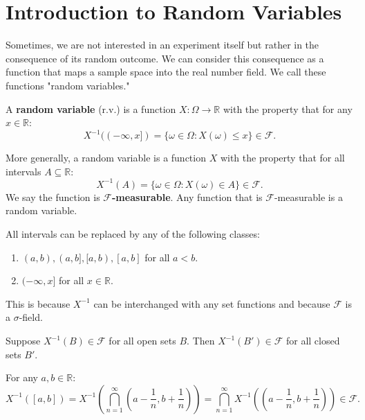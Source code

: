 \documentclass{huhtakm-template-book-v2}
\begin{document}
\section{Introduction to Random Variables}
    Sometimes, we are not interested in an experiment itself but rather in the consequence of its random outcome. We can consider this consequence as a function that maps a sample space into the real number field. We call these functions "random variables."
    \begin{defn}
        A \textbf{random variable} (r.v.) is a function $X:\Omega \to \mathbb{R}$ with the property that for any $x \in \mathbb{R}$:
        \begin{equation*}
            X^{-1}((-\infty,x]) = \{\omega \in \Omega:X(\omega) \leq x\} \in \mathcal{F}.
        \end{equation*}
    \end{defn}
    \begin{rem}
        More generally, a random variable is a function $X$ with the property that for all intervals $A\subseteq\mathbb{R}$:
        \begin{equation*}
            X^{-1}(A) = \{\omega \in \Omega: X(\omega) \in A\} \in \mathcal{F}.
        \end{equation*}
        We say the function is \textbf{$\mathcal{F}$-measurable}. Any function that is $\mathcal{F}$-measurable is a random variable.
    \end{rem}
    \begin{rem}
        All intervals can be replaced by any of the following classes:
        \begin{enumerate}
            \item $(a, b),(a, b],[a, b),[a, b]$ for all $a < b$.
            \item $(-\infty,x]$ for all $x \in \mathbb{R}$.
        \end{enumerate}
        This is because $X^{-1}$ can be interchanged with any set functions and because $\mathcal{F}$ is a $\sigma$-field.
    \end{rem}
    \begin{cla}
        Suppose $X^{-1}(B) \in \mathcal{F}$ for all open sets $B$. Then $X^{-1}(B') \in \mathcal{F}$ for all closed sets $B'$.
    \end{cla}
    \begin{proofing}
        For any $a,b \in \mathbb{R}$:
        \begin{equation*}
            X^{-1}([a, b]) = X^{-1}\left(\bigcap_{n = 1}^{\infty}\left(a-\frac{1}{n},b+\frac{1}{n}\right)\right) = \bigcap_{n = 1}^{\infty}X^{-1}\left(\left(a-\frac{1}{n},b+\frac{1}{n}\right)\right) \in \mathcal{F}.
        \end{equation*}
    \end{proofing}
\end{document}
